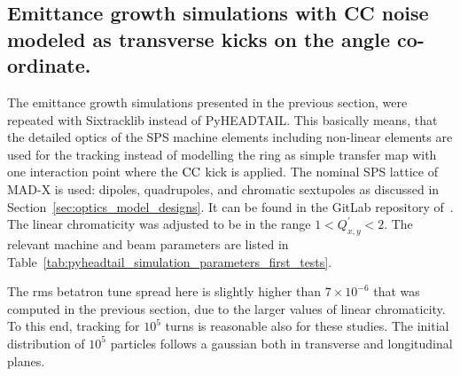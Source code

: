 
\subsection{Emittance growth simulations with CC noise modeled as transverse kicks on the angle co-ordinate.}\label{subsec:sixtracklib_kicks_transverse_angle}

The emittance growth simulations presented in the previous section, were repeated with Sixtracklib instead of PyHEADTAIL. This basically means, that the detailed optics of the SPS machine elements including non-linear elements are used for the tracking instead of modelling the ring as simple transfer map with one interaction point where the ${\mathrm{CC}}$  kick is applied. The nominal SPS lattice of MAD-X is used: dipoles, quadrupoles, and chromatic sextupoles as discussed in Section~\ref{sec:optics_model_designs}. It can be found in the GitLab repository of~\cite{cern_optics_repo}. The linear chromaticity was adjusted to be in the range $1 < Q^\prime_{x,y} < 2$. The relevant machine and beam parameters are listed in Table~\ref{tab:pyheadtail_simulation_parameters_first_tests}.

The rms betatron tune spread here is slightly higher than $7 \times 10^{-6}$ that was computed in the previous section, due to the larger values of linear chromaticity. To this end, tracking for $10^{5}$ turns is reasonable also for these studies. The initial distribution of $10^5$ particles follows a gaussian both in transverse and longitudinal planes.

